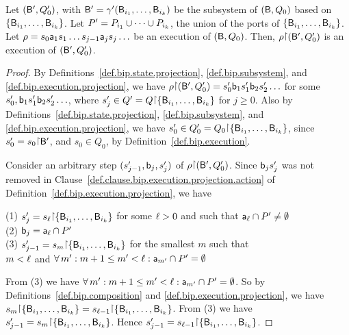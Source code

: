 \begin{proposition} \label{prop.bip.execution.projection}
Let $(\mathsf{B}', Q'_0)$, with $\mathsf{B}' = \gamma'(\mathsf{B}_{i_1},\dots,\mathsf{B}_{i_k})$ be the subsystem of $(\mathsf{B}, Q_0)$ based on $\{ \mathsf{B}_{i_1},\dots,\mathsf{B}_{i_k} \}$.
Let $P' = P_{i_1} \cup \cdots \cup P_{i_k}$,  \ie the union of the ports of $\{ \mathsf{B}_{i_1},\dots,\mathsf{B}_{i_k} \}$.
Let $\rho = s_0 \mathsf{a}_1 s_1 \ldots s_{j-1} \mathsf{a}_j s_j \ldots$ be an execution of $(\mathsf{B}, Q_0)$. 
Then, $\rho \pj (\B', Q'_0)$ is an execution of $(\mathsf{B}', Q'_0)$.
\end{proposition}

\begin{proof}
By Definitions~\ref{def.bip.state.projection}, \ref{def.bip.subsystem}, and \ref{def.bip.execution.projection}, 
we have $\rho \pj (\B', Q'_0) = s'_0 \actb_1 s'_1 \actb_2 s'_2 \ldots$ for some $s'_0,\mathsf{b}_1 s'_1 \mathsf{b}_2 s'_2 \ldots$,
where $s'_j \in Q' = Q \pj \set{\B_{i_1},\dots,\B_{i_k}}$ for $j \ge 0$.
%
Also by Definitions~\ref{def.bip.state.projection}, \ref{def.bip.subsystem}, and \ref{def.bip.execution.projection}, 
we have $s'_0 \in Q'_0 = Q_0 \pj \set{\B_{i_1},\dots,\B_{i_k}}$, since $s'_0 = s_0 \pj \B'$, and $s_0 \in Q_0$, by Definition~\ref{def.bip.execution}.

Consider an arbitrary step $(s'_{j-1}, \mathsf{b}_j, s'_j)$ of $\rho \pj (\B', Q'_0)$.
Since $\mathsf{b}_j s'_j$ was not removed in Clause~\ref{def.clause.bip.execution.projection.action} of
Definition~\ref{def.bip.execution.projection}, we have 

\noindent
(1) $s'_j = s_{\l} \pj \set{\B_{i_1},\dots,\B_{i_k}}$ for some $\ell > 0$ and such that $\mathsf{a}_{\ell} \cap P' \ne \emptyset$\\                     %
(2) $\mathsf{b}_j = \mathsf{a}_{\ell} \cap P'$\\                                                              %
(3) $s'_{j-1} = s_m \pj \set{\B_{i_1},\dots,\B_{i_k}}$ for the smallest $m$ such that\\
   \ind $m < \ell$ and
        $\forall\, m' : {m+1 \leq m' < \ell} : \mathsf{a}_{m'} \cap P' = \emptyset$                              %

\noindent
From  (3) we have $\forall\, m' : {m+1 \leq m' < \ell} : \mathsf{a}_{m'} \cap P' = \emptyset$. So by Definitions~\ref{def.bip.composition} and \ref{def.bip.execution.projection},
    we have $s_m \pj \set{\B_{i_1},\dots,\B_{i_k}} = s_{\l-1} \pj \set{\B_{i_1},\dots,\B_{i_k}}$.
From (3) we have $s'_{j-1} = s_m \pj \set{\B_{i_1},\dots,\B_{i_k}}$. 
Hence $s'_{j-1} = s_{\l-1} \pj \set{\B_{i_1},\dots,\B_{i_k}}$.


\end{proof}
